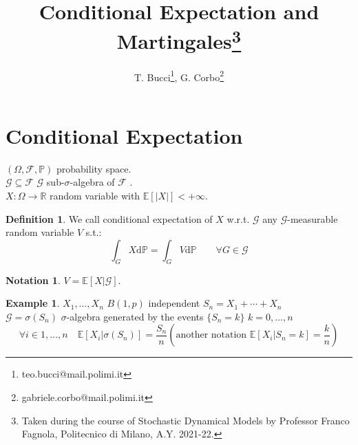 \documentclass[10pt,a4paper]{article}
\title{Conditional Expectation and Martingales\footnote{Taken during the course of Stochastic Dynamical Models by Professor Franco Fagnola, Politecnico di Milano, A.Y. 2021-22.}}
\author{T. Bucci\footnote{teo.bucci@mail.polimi.it}, G. Corbo\footnote{gabriele.corbo@mail.polimi.it}}
\theoremstyle{definition}
\newtheorem{defi}{Definition}[section]
\newtheorem*{notat}{Notation}
\newtheorem{exi}{Example}[section]
\begin{document}
\maketitle
	\section{Conditional Expectation}
		$(\Omega,\mathcal{F},\mathbb{P})$  probability space. \\
		$\mathcal{G}\subseteq\mathcal{F}$           $ \mathcal{G}$ sub-$\sigma$-algebra of  $\mathcal{F} $ .\\
		$ X:\Omega\to\mathbb{R} $ random variable with $ \mathbb{E}[|X|]<+\infty .$
		\begin{defi}
			We call conditional expectation of $X$ w.r.t. $\mathcal{G}$ any $\mathcal{G}$-measurable random variable $ V $ s.t.:
			\begin{equation}
				\int_{G}X\mathrm{d}\mathbb{P} = \int_{G}V\mathrm{d}\mathbb{P}  \qquad    \forall G \in \mathcal{G}
			\end{equation}
		\end{defi}
		\begin{notat}
			$V=\mathbb{E}[X|\mathcal{G}]$.
		\end{notat}
	\begin{exi}
		$X_1,\ldots,X_n$  $ B(1,p) $ independent   $ S_n= X_1+\cdots+X_n$ \\
		$\mathcal{G}=\sigma(S_n)$ $\sigma$-algebra generated by the events $ \{S_n=k\}$   $ k=0,\ldots,n$ 
		\begin{equation*}
			\forall i\in {1,\ldots,n}  \quad  \mathbb{E}[X_i|\sigma(S_n)]=\frac{S_n}{n}  \left(\text{another notation } \mathbb{E}[X_i|S_n=k]=\frac{k}{n}\right) 
		\end{equation*}
	\end{exi}
\end{document}
